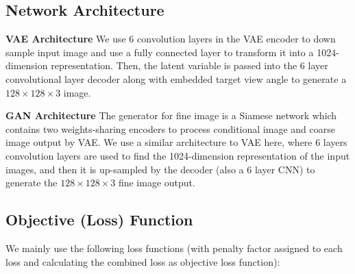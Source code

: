 \documentclass[10pt,conference]{IEEEtran}
\begin{document}
\subsection{Network Architecture}
\textbf{VAE Architecture} 
We use 6 convolution layers in the VAE encoder to down sample input image and use a fully connected layer to transform it into a 1024-dimension representation. Then, the latent variable is passed into the 6 layer convolutional layer decoder along with embedded target view angle to generate a $128\times128\times3$ image.

\textbf{GAN Architecture} 
The generator for fine image is a Siamese network which contains two weights-sharing encoders to process conditional image and coarse image output by VAE. We use a similar architecture to VAE here, where 6 layers convolution layers are used to find the 1024-dimension representation of the input images, and then it is up-sampled by the decoder (also a 6 layer CNN) to generate the $128\times128\times3$ fine image output.

\subsection{Objective (Loss) Function}
We mainly use the following loss functions (with penalty factor assigned to each loss and calculating the combined loss as objective loss function):
\end{document}
